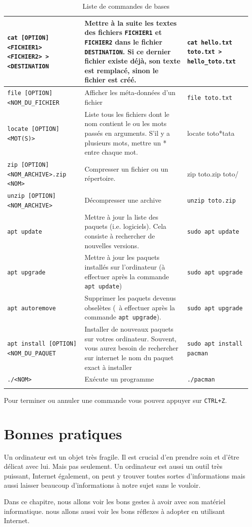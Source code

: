 \documentclass[12pt]{book}
\begin{document}
\begin{longtable}{|p{}|p{}|p{}|}
		\texttt{cat [OPTION] <FICHIER1> <FICHIER2> > <DESTINATION} & Mettre à la suite les textes des fichiers \texttt{FICHIER1} et \texttt{FICHIER2} dans le fichier \texttt{DESTINATION}. Si ce dernier fichier existe déjà, son texte est remplacé, sinon le fichier est créé. & \texttt{cat hello.txt toto.txt > hello\_toto.txt}\\\hline
		\texttt{file [OPTION] <NOM\_DU\_FICHIER} & Afficher les méta-données d'un fichier & \texttt{file toto.txt}\\\hline
		\texttt{locate [OPTION] <MOT(S)>} & Liste tous les fichiers dont le nom contient le ou les mots passés en arguments. S'il y a plusieurs mots, mettre un * entre chaque mot. & locate toto*tata\\\hline
		\texttt{zip [OPTION] <NOM\_ARCHIVE>.zip <NOM>} & Compresser un fichier ou un répertoire. & zip toto.zip toto/\\\hline
		\texttt{unzip [OPTION] <NOM\_ARCHIVE>} & Décompresser une archive & \texttt{unzip toto.zip}\\\hline
		\texttt{apt update} & Mettre à jour la liste des paquets (i.e. logiciels). Cela consiste à rechercher de nouvelles versions. & \texttt{sudo apt update}\\\hline
		\texttt{apt upgrade} & Mettre à jour les paquets  installés sur l'ordinateur (à effectuer après la commande \texttt{apt update}) & \texttt{sudo apt upgrade}\\\hline
		\texttt{apt autoremove} & Supprimer les paquets devenus obselètes (\ à effectuer après la commande \texttt{apt upgrade}). & \texttt{sudo apt upgrade}\\\hline
		\texttt{apt install [OPTION] <NOM\_DU\_PAQUET} & Installer de nouveaux paquets sur votres ordinateur. Souvent, vous aurez besoin de rechercher sur internet le nom du paquet exact à installer & \texttt{sudo apt install pacman}\\\hline
		\texttt{./<NOM>} & Exécute un programme & \texttt{./pacman}\\\hline
	\caption{Liste de commandes de bases}
	\label{tab:commande}
	\end{longtable}\par
	Pour terminer ou annuler une commande vous pouvez appuyer sur \texttt{CTRL+Z}.

\chapter{Bonnes pratiques}
	Un ordinateur est un objet très fragile. 
	Il est crucial d'en prendre soin et d'être délicat avec lui.
	Mais pas seulement. 
	Un ordinateur est aussi un outil très puissant, Internet également, on peut y trouver toutes sortes d'informations mais aussi laisser beaucoup d'informations à notre sujet sans le vouloir.\par
	Dans ce chapitre, nous allons voir les bons gestes à avoir avec son matériel informatique.
	nous allons aussi voir les bons réflexes à adopter en utilisant Internet.
\end{document}
